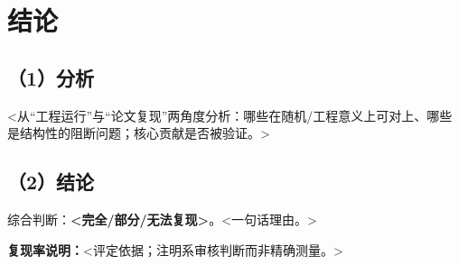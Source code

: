 \documentclass[11pt]{article}
\newcommand{\verdict}[1]{{\bfseries #1}}
\begin{document}
\section{结论}
\subsection*{（1）分析}
<从“工程运行”与“论文复现”两角度分析：哪些在随机/工程意义上可对上、哪些是结构性的阻断问题；核心贡献是否被验证。>

\subsection*{（2）结论}
综合判断：\verdict{<完全/部分/无法复现>}。<一句话理由。>

\bigskip
{}

\medskip
\noindent\textbf{复现率说明：}<评定依据；注明系审核判断而非精确测量。>
\end{document}
